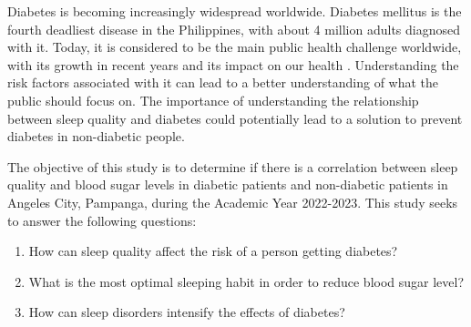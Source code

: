 
Diabetes is becoming increasingly widespread worldwide. Diabetes mellitus is the
fourth deadliest disease in the Philippines, with about 4 million adults
diagnosed with it. Today, it is considered to be the main public health
challenge worldwide, with its growth in recent years and its impact on our
health \parencite{cudis-2021}. Understanding the risk factors associated with it
can lead to a better understanding of what the public should focus on. The
importance of understanding the relationship between sleep quality and diabetes
could potentially lead to a solution to prevent diabetes in non-diabetic people.


The objective of this study is to determine if there is a correlation between
sleep quality and blood sugar levels in diabetic patients and non-diabetic
patients in Angeles City, Pampanga, during the Academic Year 2022-2023. This
study seeks to answer the following questions:

\begin{enumerate}
    \item How can sleep quality affect the risk of a person getting diabetes?
    \item What is the most optimal sleeping habit in order to reduce blood sugar
level?
    \item How can sleep disorders intensify the effects of diabetes?
\end{enumerate}
